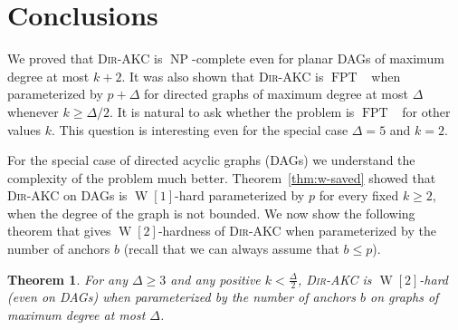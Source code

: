 \documentclass[11pt,a4paper]{article}
\newtheorem{theorem}{Theorem}
\DeclareMathOperator{\operatorClassNP}{NP}
\newcommand{\classNP}{\ensuremath{\operatorClassNP}}
\DeclareMathOperator{\operatorClassFPT}{FPT}
\newcommand{\classFPT}{\ensuremath{\operatorClassFPT}}
\DeclareMathOperator{\operatorClassW}{W}
\newcommand{\classW}[1]{\ensuremath{\operatorClassW[#1]}}
\newcommand{\DAKC}{\textsc{Dir-AKC}\xspace}
\begin{document}
\section{Conclusions}\label{sec:concl}
We proved that \DAKC is \classNP-complete even for planar DAGs of maximum degree at most $k+2$. It was also shown  that \DAKC
is \classFPT~ when parameterized by $p+\Delta$ for directed graphs of maximum degree at most
$\Delta$ whenever $k\geq\Delta/2$. It is natural to ask whether the problem is \classFPT~ for other values $k$. This question
is interesting even for the special case $\Delta=5$ and $k=2$.

For the special case of  directed acyclic graphs (DAGs) we understand  the complexity of the problem much better.
Theorem~\ref{thm:w-saved} showed that \DAKC on DAGs is \classW{1}-hard parameterized by $p$ for every fixed $k\geq 2$, when
the degree of the graph is not bounded. We now show the following theorem  that gives
\classW{2}-hardness of \DAKC when parameterized  by the number of anchors $b$ (recall that we can always assume that $b\leq
p$).

\begin{theorem}\label{thm:w-hardness-dags-bounded-degree}
For any $\Delta\geq 3$ and any positive $k<\frac{\Delta}{2}$,  \DAKC  is \classW{2}-hard (even on DAGs) when parameterized by
the number of anchors $b$ on graphs of maximum degree at most $\Delta$.
\end{theorem}
\end{document}
